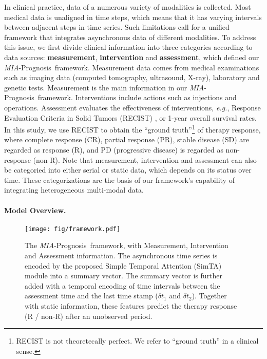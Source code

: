 \documentclass[runningheads]{llncs}
\newcommand{\eg}{\textit{e.g.}}
\newcommand{\miap}{\emph{MIA}-Prognosis}
\begin{document}
	In clinical practice, data of a numerous variety of modalities is collected. Most medical data is unaligned in time steps, which means that it has varying intervals between adjacent steps in time series. Such limitations call for a unified framework that integrates asynchronous data of different modalities. To address this issue, we first divide clinical information into three categories according to data sources: \textbf{measurement}, \textbf{intervention} and \textbf{assessment}, which defined our \miap~framework. Measurement data comes from medical examinations such as imaging data (computed tomography, ultrasound, X-ray), laboratory and genetic tests. Measurement is the main information in our \miap~framework. Interventions include actions such as injections and operations. Assessment evaluates the effectiveness of interventions, \eg, Response Evaluation Criteria in Solid Tumors (RECIST) \cite{Eisenhauer2009NewRE}, or 1-year overall survival rates. In this study, we use RECIST to obtain the ``ground truth''\footnote{RECIST is not theoretecally perfect. We refer to ``ground truth'' in a clinical sense.} of therapy response, where complete response (CR), partial response (PR), stable disease (SD) are regarded as response (R), and PD (progressive disease) is regarded as non-response (non-R). Note that measurement, intervention and assessment can also be categoried into either serial or static data, which depends on its status over time. These categorizations are the basis of our framework's capability of integrating heterogeneous multi-modal data.

\paragraph{\textbf{Model Overview.}}

\begin{figure}[tb]
	\texttt{[image: fig/framework.pdf]}
	\caption{The \miap~framework, with Measurement, Intervention and Assessment information. The asynchronous time series is encoded by the proposed Simple Temporal Attention (SimTA) module into a summary vector. The summary vector is further added with a temporal encoding of time intervals between the assessment time and the last time stamp ($\delta t_1$ and $\delta t_2$). Together with static information, these features predict the therapy response (R / non-R) after an unobserved period.} \label{fig:framework}
\end{figure}
\end{document}

